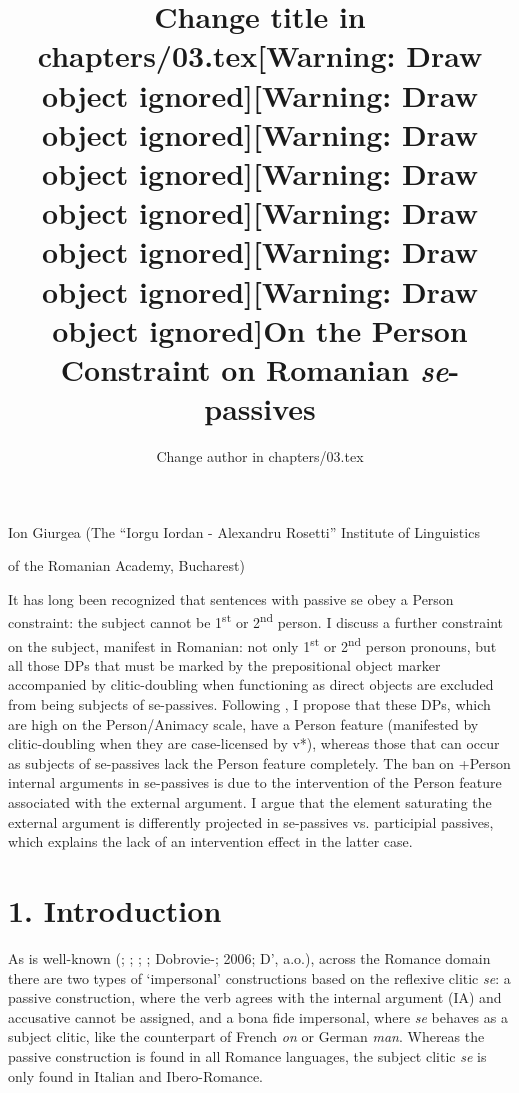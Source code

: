 \documentclass[output=paper]{langsci/langscibook}
\author{Change author in chapters/03.tex}
\title{Change title in chapters/03.tex}
\begin{document}
\title{[Warning: Draw object ignored][Warning: Draw object ignored][Warning: Draw object ignored][Warning: Draw object ignored][Warning: Draw object ignored][Warning: Draw object ignored][Warning: Draw object ignored]On the Person Constraint on Romanian \textit{se}{}-passives}

Ion Giurgea (The “Iorgu Iordan - Alexandru Rosetti” Institute of Linguistics

of the Romanian Academy, Bucharest)

\begin{stylelsAbstract}
It has long been recognized that sentences with passive se obey a Person constraint: the subject cannot be 1\textsuperscript{st} or 2\textsuperscript{nd} person. I discuss a further constraint on the subject, manifest in Romanian: not only 1\textsuperscript{st} or 2\textsuperscript{nd} person pronouns, but all those DPs that must be marked by the prepositional object marker accompanied by clitic-doubling when functioning as direct objects are excluded from being subjects of se-passives. Following \citet{Richards2008}, I propose that these DPs, which are high on the Person/Animacy scale, have a Person feature (manifested by clitic-doubling when they are case-licensed by v*), whereas those that can occur as subjects of se-passives lack the Person feature completely. The ban on +Person internal arguments in se-passives is due to the intervention of the Person feature associated with the external argument. I argue that the element saturating the external argument is differently projected in se-passives vs. participial passives, which explains the lack of an intervention effect in the latter case.
\end{stylelsAbstract}

\section{ 1. Introduction}

As is well-known (\citealt{Belletti1982}; \citealt{Burzio1986}; \citealt{Manzini1986}; \citealt{Cinque1988}; Dobrovie-\citealt{Sorin1998}; 2006; D’\citealt{Alessandro2007}, a.o.), across the Romance domain there are two types of ‘impersonal’ constructions based on the reflexive clitic \textit{se}: a passive construction, where the verb agrees with the internal argument (IA) and accusative cannot be assigned, and a bona fide impersonal, where \textit{se} behaves as a subject clitic, like the counterpart of French \textit{on} or German \textit{man}. Whereas the passive construction is found in all Romance languages, the subject clitic \textit{se} is only found in Italian and Ibero-Romance.
\end{document}
